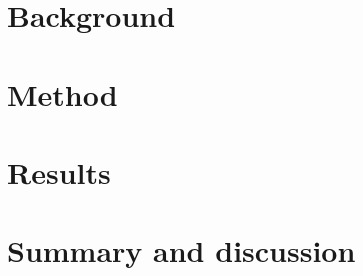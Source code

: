 \documentclass[nocoverpage,swedish,g5paper]{thesis}
\begin{document}
\chapter{Background}\label{ch:Background}


\chapter{Method}\label{ch:Method}


%

%

\chapter{Results}\label{ch:Results}


\chapter{Summary and discussion}\label{ch:Summary}




%



\end{document}
